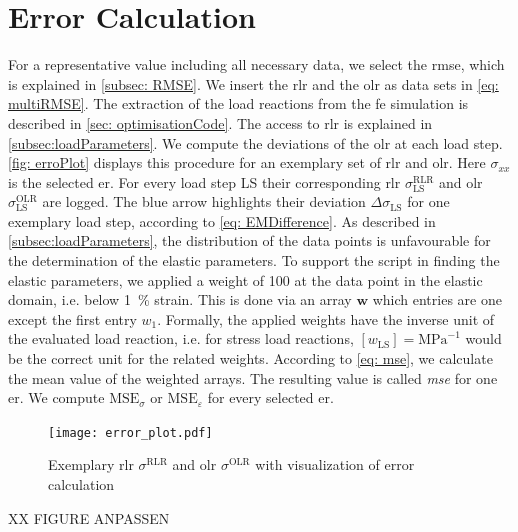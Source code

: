 \section{Error Calculation}\label{sec: errorCalculation}
For a representative value including all necessary data, we select the \acrshort{rmse}, which is explained in \autoref{subsec: RMSE}.
We insert the \acrlong{rlr} and the \acrlong{olr} as data sets in \autoref{eq: multiRMSE}.
The extraction of the load reactions from the \acrshort{fe} simulation is described in \autoref{sec: optimisationCode}.
The access to \acrlong{rlr} is explained in \autoref{subsec:loadParameters}.
We compute the deviations of the \acrlong{olr} at each load step. \autoref{fig: erroPlot} displays this procedure for an exemplary set of \acrlong{rlr} and \acrlong{olr}. Here $\sigma_{xx}$ is the selected \acrlong{er}.
For every load step LS their corresponding \acrfull{rlr} $\sigma_{\scriptscriptstyle\text{LS}}^{\scriptscriptstyle\text{RLR}}$ and \acrfull{olr} $\sigma_{\scriptscriptstyle\text{LS}}^{\scriptscriptstyle\text{OLR}}$ are logged. The blue arrow highlights their deviation $\Delta\sigma_{\scriptscriptstyle\text{LS}}$ for one exemplary load step, according to \autoref{eq: EMDifference}. 
As described in \autoref{subsec:loadParameters}, the distribution of the data points is unfavourable for the determination of the elastic parameters. 
To support the script in finding the elastic parameters, we applied a weight of 100 at the data point in the elastic domain, i.e. below 1 \% strain. This is done via an array $\boldsymbol{w}$ which entries are one except the first entry $w_{\scriptscriptstyle\text{1}}$. Formally, the applied weights have the inverse unit of the evaluated load reaction, i.e. for stress load reactions, $[w_{\text{LS}}] = \text{MPa}^{-1}$ would be the correct unit for the related weights.
According to \autoref{eq: mse}, we calculate the mean value of the weighted arrays.
The resulting value is called \emph{\acrfull{mse}} for one \acrlong{er}. We compute $\text{MSE}_{\sigma}$ or $\text{MSE}_{\varepsilon}$ for every selected \acrlong{er}. 

\begin{figure}[H]
    \centering
    \texttt{[image: error\_plot.pdf]}
    \caption{Exemplary \acrlong{rlr} $\sigma^{\scriptscriptstyle\text{RLR}}$ and \acrlong{olr} $\sigma^{\scriptscriptstyle\text{OLR}}$ with visualization of error calculation}
    \label{fig: erroPlot}
\end{figure}
XX FIGURE ANPASSEN

